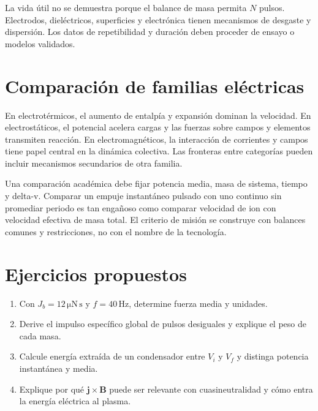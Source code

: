 La vida útil no se demuestra porque el balance de masa permita $N$ pulsos. Electrodos, dieléctricos, superficies y electrónica tienen mecanismos de desgaste y dispersión. Los datos de repetibilidad y duración deben proceder de ensayo o modelos validados.
\section{Comparación de familias eléctricas}
En electrotérmicos, el aumento de entalpía y expansión dominan la velocidad. En electrostáticos, el potencial acelera cargas y las fuerzas sobre campos y elementos transmiten reacción. En electromagnéticos, la interacción de corrientes y campos tiene papel central en la dinámica colectiva. Las fronteras entre categorías pueden incluir mecanismos secundarios de otra familia.

Una comparación académica debe fijar potencia media, masa de sistema, tiempo y delta-v. Comparar un empuje instantáneo pulsado con uno continuo sin promediar periodo es tan engañoso como comparar velocidad de ion con velocidad efectiva de masa total. El criterio de misión se construye con balances comunes y restricciones, no con el nombre de la tecnología.
\section{Ejercicios propuestos}
\begin{enumerate}
\item Con $J_b=12\,\mathrm{\mu N\,s}$ y $f=40\,\mathrm{Hz}$, determine fuerza media y unidades.
\item Derive el impulso específico global de pulsos desiguales y explique el peso de cada masa.
\item Calcule energía extraída de un condensador entre $V_i$ y $V_f$ y distinga potencia instantánea y media.
\item Explique por qué $\mathbf j\times\mathbf B$ puede ser relevante con cuasineutralidad y cómo entra la energía eléctrica al plasma.
\end{enumerate}

